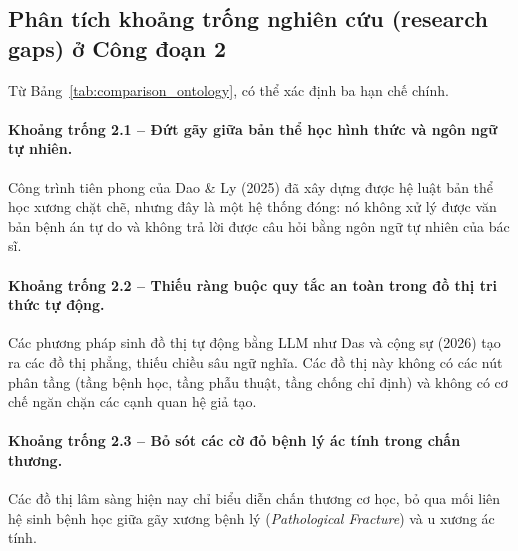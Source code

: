 \subsection{Phân tích khoảng trống nghiên cứu (research gaps) ở Công đoạn 2}
Từ Bảng~\ref{tab:comparison_ontology}, có thể xác định ba hạn chế chính.

\paragraph{Khoảng trống 2.1 -- Đứt gãy giữa bản thể học hình thức và ngôn ngữ tự nhiên.}
Công trình tiên phong của Dao \& Ly (2025) \cite{dao2025ontology} đã xây dựng được hệ luật bản thể học xương chặt chẽ, nhưng đây là một hệ thống đóng: nó không xử lý được văn bản bệnh án tự do và không trả lời được câu hỏi bằng ngôn ngữ tự nhiên của bác sĩ.

\paragraph{Khoảng trống 2.2 -- Thiếu ràng buộc quy tắc an toàn trong đồ thị tri thức tự động.}
Các phương pháp sinh đồ thị tự động bằng LLM như Das và cộng sự (2026) \cite{das2025clinicalkg} tạo ra các đồ thị phẳng, thiếu chiều sâu ngữ nghĩa. Các đồ thị này không có các nút phân tầng (tầng bệnh học, tầng phẫu thuật, tầng chống chỉ định) và không có cơ chế ngăn chặn các cạnh quan hệ giả tạo.

\paragraph{Khoảng trống 2.3 -- Bỏ sót các cờ đỏ bệnh lý ác tính trong chấn thương.}
Các đồ thị lâm sàng hiện nay chỉ biểu diễn chấn thương cơ học, bỏ qua mối liên hệ sinh bệnh học giữa gãy xương bệnh lý (\emph{Pathological Fracture}) và u xương ác tính.
